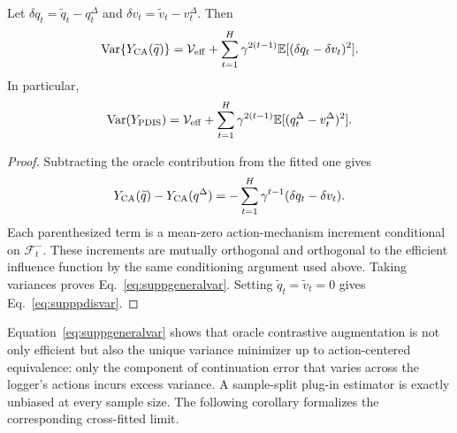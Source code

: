 \begin{theorem}
\label{thm:suppvariance}
Let
$\delta q_t=\widetilde q_t-q_t^\Delta$ and
$\delta v_t=\widetilde v_t-v_t^\Delta$. Then
\begin{equation}
\operatorname{Var}\{Y_{\rm CA}(\widetilde q)\}
=\mathcal V_{\rm eff}+
\sum_{t=1}^H\gamma^{2(t-1)}
\mathbb{E}[(\delta q_t-\delta v_t)^2].
\label{eq:suppgeneralvar}
\end{equation}
In particular,
\begin{equation}
\operatorname{Var}(Y_{\rm PDIS})
=\mathcal V_{\rm eff}+
\sum_{t=1}^H\gamma^{2(t-1)}
\mathbb{E}[(q_t^\Delta-v_t^\Delta)^2].
\label{eq:supppdisvar}
\end{equation}
\end{theorem}
\begin{proof}
Subtracting the oracle contribution from the fitted one gives
\[
Y_{\rm CA}(\widetilde q)-Y_{\rm CA}(q^\Delta)
=-\sum_{t=1}^H\gamma^{t-1}(\delta q_t-\delta v_t).
\]
Each parenthesized term is a mean-zero action-mechanism increment conditional on $\mathcal F_t^-$. These increments are mutually orthogonal and orthogonal to the efficient influence function by the same conditioning argument used above. Taking variances proves Eq.~\eqref{eq:suppgeneralvar}. Setting $\widetilde q_t=\widetilde v_t=0$ gives Eq.~\eqref{eq:supppdisvar}.
\end{proof}

Equation~\eqref{eq:suppgeneralvar} shows that oracle contrastive augmentation is not only efficient but also the unique variance minimizer up to action-centered equivalence: only the component of continuation error that varies across the logger's actions incurs excess variance. A sample-split plug-in estimator is exactly unbiased at every sample size. The following corollary formalizes the corresponding cross-fitted limit.


